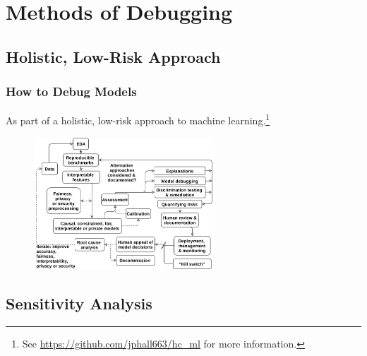 \documentclass[11pt,
               aspectratio=169,
               hyperref={colorlinks}
               ]{beamer}
\begin{document}
	\section{Methods of Debugging}

		\subsection{Holistic, Low-Risk Approach}
	
			\begin{frame}
		
				\frametitle{How to Debug Models}
		
				\footnotesize{As part of a holistic, low-risk approach to machine learning}.\footnote{\tiny{See \url{https://github.com/jphall663/hc_ml} for more information.}}
				\begin{figure}
					\begin{center}
						\includegraphics[height=140pt]{../img/rml_diagram_no_hilite.png}
					\end{center}
				\end{figure}	
				\normalsize
		
			\end{frame}

		\subsection{Sensitivity Analysis}
\end{document}
